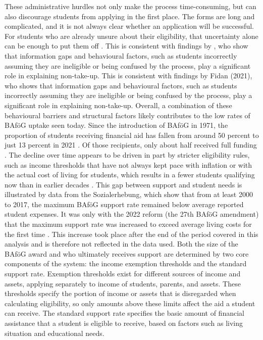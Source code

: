 These administrative hurdles not only make the process time-consuming, but can also discourage students from applying in the first place. The forms are long and complicated, and it is not always clear whether an application will be successful. For students who are already unsure about their eligibility, that uncertainty alone can be enough to put them off \citep{kroher_studierendenbefragung_2023}. This is consistent with findings by \cite{fidan_why_2021}, who show that information gaps and behavioural factors, such as students incorrectly assuming they are ineligible or being confused by the process, play a significant role in explaining non-take-up. This is consistent with findings by Fidan (2021), who shows that information gaps and behavioural factors, such as students incorrectly assuming they are ineligible or being confused by the process, play a significant role in explaining non-take-up.
Overall, a combination of these behavioural barriers and structural factors likely contributes to the low rates of BAföG uptake seen today. Since the introduction of BAföG in 1971, the proportion of students receiving financial aid has fallen from around 50 percent to just 13 percent in 2021 \citep{kroher_studierendenbefragung_2023}. Of those recipients, only about half received full funding \citep{meier_zur_2024}. The decline over time appears to be driven in part by stricter eligibility rules, such as income thresholds that have not always kept pace with inflation or with the actual cost of living for students, which results in a fewer students qualifying now than in earlier decades \citep{meier_zur_2024}.
This gap between support and student needs is illustrated by data from the Sozialerhebung, which show that from at least 2000 to 2017, the maximum BAföG support rate remained below average reported student expenses. It was only with the 2022 reform (the 27th BAföG amendment) that the maximum support rate was increased to exceed average living costs for the first time \citep{meier_bafog_2024, meier_zur_2024}. This increase took place after the end of the period covered in this analysis and is therefore not reflected in the data used.
Both the size of the BAföG award and who ultimately receives support are determined by two core components of the system: the income exemption thresholds and the standard support rate. Exemption thresholds exist for different sources of income and assets, applying separately to income of students, parents, and assets. These thresholds specify the portion of income or assets that is disregarded when calculating eligibility, so only amounts above these limits affect the aid a student can receive. The standard support rate specifies the basic amount of financial assistance that a student is eligible to receive, based on factors such as living situation and educational needs.
